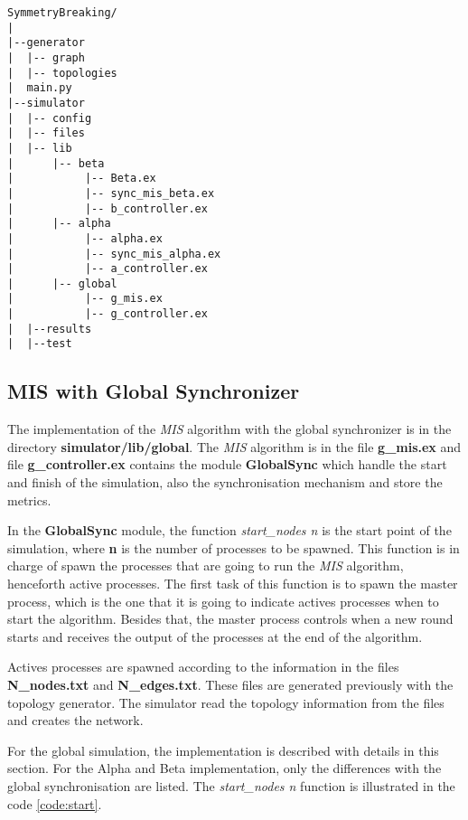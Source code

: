 \begin{verbatim}
SymmetryBreaking/
|
|--generator
|  |-- graph
|  |-- topologies
|  main.py
|--simulator
|  |-- config
|  |-- files
|  |-- lib
|      |-- beta
|           |-- Beta.ex
|           |-- sync_mis_beta.ex
|           |-- b_controller.ex
|      |-- alpha
|           |-- alpha.ex
|           |-- sync_mis_alpha.ex
|           |-- a_controller.ex
|      |-- global
|           |-- g_mis.ex
|           |-- g_controller.ex
|  |--results
|  |--test
\end{verbatim}

\subsection{MIS with Global Synchronizer}
 
The implementation of the \textit{MIS} algorithm with the global synchronizer is in the directory \textbf{simulator/lib/global}. The \textit{MIS} algorithm is in the file \textbf{g\_mis.ex} and file \textbf{g\_controller.ex} contains the module \textbf{GlobalSync} which handle the start and finish of the simulation, also the synchronisation mechanism and store the metrics.

In the \textbf{GlobalSync} module, the function \textit{start\_nodes n} is the start point of the simulation, where \textbf{n} is the number of processes to be spawned. This function is in charge of spawn the processes that are going to run the \textit{MIS} algorithm, henceforth active processes. The first task of this function is to spawn the master process, which is the one that it is going to indicate actives processes when to start the algorithm.  Besides that, the master process controls when a new round starts and receives the output of the processes at the end of the algorithm.

Actives processes are spawned according to the information in the files  \textbf{N\_nodes.txt} and \textbf{N\_edges.txt}. These files are generated previously with the topology generator. The simulator read the topology information from the files and creates the network.  

For the global simulation, the implementation is described with details in this section. For the Alpha and Beta implementation, only the differences with the global synchronisation are listed. The  \textit{start\_nodes n} function is illustrated in the code \ref{code:start}.


